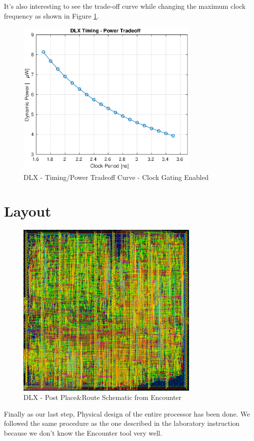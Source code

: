 \documentclass[12pt]{article}
\begin{document}
It's also interesting to see the trade-off curve while changing the maximum clock frequency as shown in Figure \ref{PPA}.
\begin{figure}[!ht]
	\includegraphics[width=0.8\textwidth, center]{images/PPA.eps}
	\caption{DLX - Timing/Power Tradeoff Curve - Clock Gating Enabled}
	\label{PPA}
\end{figure}


\section{Layout}\label{Layout}
\begin{figure}[!ht]
	\includegraphics[width=0.8\textwidth, center]{images/dlx-floorplan.jpg}
	\caption{DLX - Post Place\&Route Schematic from Encounter}
	\label{FLORPLANR}
\end{figure}
Finally as our last step, Physical design of the entire processor has been done. We followed the same procedure as the one described in the laboratory instruction because we don't know the Encounter tool very well.
\end{document}
